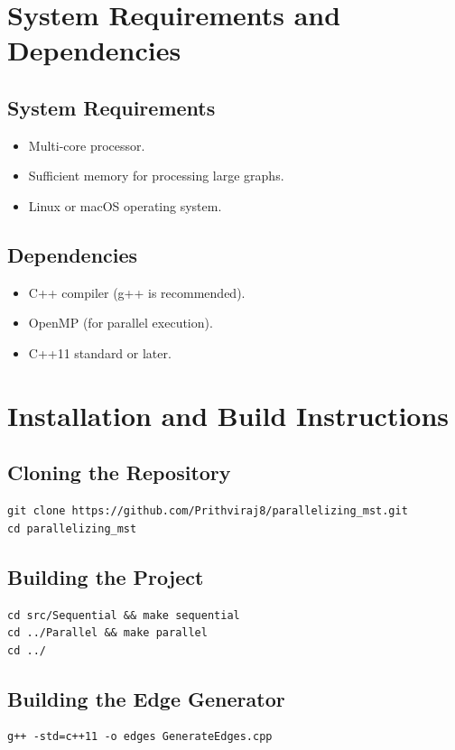\documentclass[11pt]{article}
\begin{document}
\section{System Requirements and Dependencies}
\subsection{System Requirements}
\begin{itemize}
    \item Multi-core processor.
    \item Sufficient memory for processing large graphs.
    \item Linux or macOS operating system.
\end{itemize}

\subsection{Dependencies}
\begin{itemize}
    \item C++ compiler (g++ is recommended).
    \item OpenMP (for parallel execution).
    \item C++11 standard or later.
\end{itemize}

\section{Installation and Build Instructions}
\subsection{Cloning the Repository}
\begin{lstlisting}
git clone https://github.com/Prithviraj8/parallelizing_mst.git
cd parallelizing_mst
\end{lstlisting}

\subsection{Building the Project}
\begin{lstlisting}
cd src/Sequential && make sequential
cd ../Parallel && make parallel
cd ../
\end{lstlisting}

\subsection{Building the Edge Generator}
\begin{lstlisting}
g++ -std=c++11 -o edges GenerateEdges.cpp
\end{lstlisting}
\end{document}
